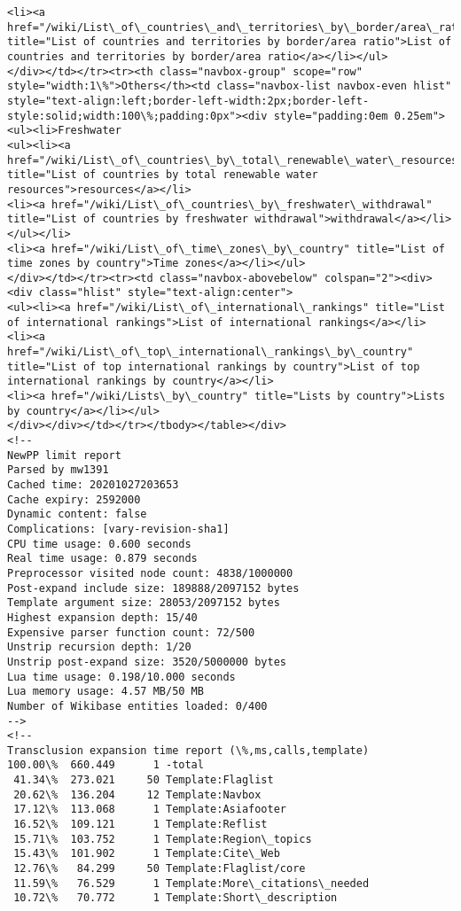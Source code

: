 \documentclass[11pt]{article}
\begin{document}
\begin{Verbatim}[commandchars=\\\{\}]
<li><a href="/wiki/List\_of\_countries\_and\_territories\_by\_border/area\_ratio" title="List of countries and territories by border/area ratio">List of countries and territories by border/area ratio</a></li></ul>
</div></td></tr><tr><th class="navbox-group" scope="row" style="width:1\%">Others</th><td class="navbox-list navbox-even hlist" style="text-align:left;border-left-width:2px;border-left-style:solid;width:100\%;padding:0px"><div style="padding:0em 0.25em">
<ul><li>Freshwater
<ul><li><a href="/wiki/List\_of\_countries\_by\_total\_renewable\_water\_resources" title="List of countries by total renewable water resources">resources</a></li>
<li><a href="/wiki/List\_of\_countries\_by\_freshwater\_withdrawal" title="List of countries by freshwater withdrawal">withdrawal</a></li></ul></li>
<li><a href="/wiki/List\_of\_time\_zones\_by\_country" title="List of time zones by country">Time zones</a></li></ul>
</div></td></tr><tr><td class="navbox-abovebelow" colspan="2"><div><div class="hlist" style="text-align:center">
<ul><li><a href="/wiki/List\_of\_international\_rankings" title="List of international rankings">List of international rankings</a></li>
<li><a href="/wiki/List\_of\_top\_international\_rankings\_by\_country" title="List of top international rankings by country">List of top international rankings by country</a></li>
<li><a href="/wiki/Lists\_by\_country" title="Lists by country">Lists by country</a></li></ul>
</div></div></td></tr></tbody></table></div>
<!-- 
NewPP limit report
Parsed by mw1391
Cached time: 20201027203653
Cache expiry: 2592000
Dynamic content: false
Complications: [vary‐revision‐sha1]
CPU time usage: 0.600 seconds
Real time usage: 0.879 seconds
Preprocessor visited node count: 4838/1000000
Post‐expand include size: 189888/2097152 bytes
Template argument size: 28053/2097152 bytes
Highest expansion depth: 15/40
Expensive parser function count: 72/500
Unstrip recursion depth: 1/20
Unstrip post‐expand size: 3520/5000000 bytes
Lua time usage: 0.198/10.000 seconds
Lua memory usage: 4.57 MB/50 MB
Number of Wikibase entities loaded: 0/400
-->
<!--
Transclusion expansion time report (\%,ms,calls,template)
100.00\%  660.449      1 -total
 41.34\%  273.021     50 Template:Flaglist
 20.62\%  136.204     12 Template:Navbox
 17.12\%  113.068      1 Template:Asiafooter
 16.52\%  109.121      1 Template:Reflist
 15.71\%  103.752      1 Template:Region\_topics
 15.43\%  101.902      1 Template:Cite\_Web
 12.76\%   84.299     50 Template:Flaglist/core
 11.59\%   76.529      1 Template:More\_citations\_needed
 10.72\%   70.772      1 Template:Short\_description

\end{Verbatim}
\end{document}
